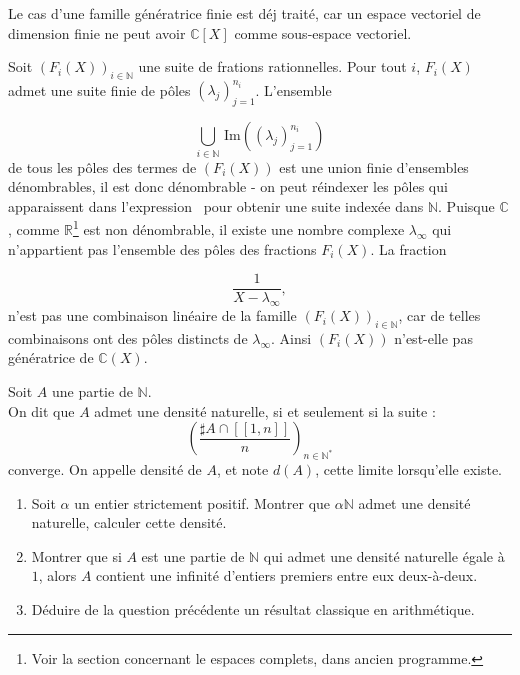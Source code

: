 \begin{sol}
Le cas d'une famille g\'en\'eratrice finie est d\'ej trait\'e, car un espace vectoriel de dimension finie ne peut avoir %
$\mathbb{C} [X]$ comme sous-espace vectoriel.

\par
Soit \((F_i(X))_{i\in\mathbb{N}}\) une suite de frations rationnelles. %
Pour tout \(i\), \(F_i(X)\) admet une suite finie de p\^oles \((\lambda_j)_{j=1}^{n_i}\). %
L'ensemble

\begin{equation}
\bigcup\limits_{i\in\mathbb{N}}\,\text{Im}((\lambda_j)_{j=1}^{n_i})
\label{eq:def_poles_ij}
\end{equation}
de tous les p\^oles des termes de \((F_i(X))\) est une union finie d'ensembles d\'enombrables, %
il est donc d\'enombrable - on peut r\'eindexer les p\^oles qui apparaissent dans l'expression~ %
pour obtenir une suite index\'ee dans \(\mathbb{N}\). %
Puisque \(\mathbb{C}\), comme \(\mathbb{R}\)\footnote{Voir la section concernant le espaces complets, dans ancien programme.}%
est non d\'enombrable, il existe une nombre complexe \(\lambda_{\infty}\) qui n'appartient pas  l'ensemble des p\^oles des fractions \(F_i(X)\). %
La fraction

\[\frac{1}{X-\lambda_{\infty}},\]
n'est pas une combinaison lin\'eaire de la famille \((F_i(X))_{i\in\mathbb{N}}\), %
car de telles combinaisons ont des p\^oles distincts de \(\lambda_{\infty}\). %
Ainsi \((F_i(X))\) n'est-elle pas g\'en\'eratrice de \(\mathbb{C}(X)\).
\end{sol}


\begin{exer}
Soit $A$ une partie de $\mathbb{N}$.\\
On dit que $A$ admet une densité naturelle, si et seulement si la suite :
\[\left(\frac{\sharp A \cap [\![1,n]\!]}{n}\right)_{n \in \mathbb{N}^{\ast}}\]
converge. On appelle densité de $A$, et note $d(A)$, cette limite lorsqu'elle existe.
\begin{enumerate}
\item Soit $\alpha$ un entier strictement positif. Montrer que $\alpha \mathbb{N}$ admet une densité naturelle, %
calculer cette densité.
\item Montrer que si $A$ est une partie de $\mathbb{N}$ qui admet une densité naturelle égale à $1$, %
alors $A$ contient une infinité d'entiers premiers entre eux deux-à-deux.
\item Déduire de la question précédente un résultat classique en arithmétique.%
\end{enumerate}
\end{exer}

